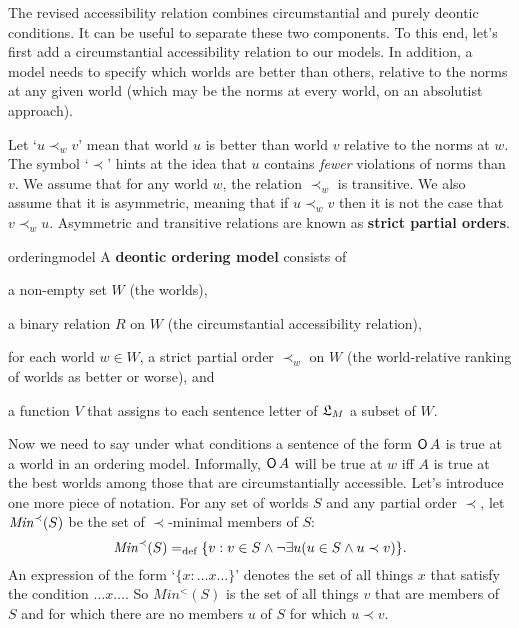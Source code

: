 The revised accessibility relation combines circumstantial and purely deontic
conditions. It can be useful to separate these two components. To this end,
let's first add a circumstantial accessibility relation to our models. In
addition, a model needs to specify which worlds are better than others, relative
to the norms at any given world (which may be the norms at every world, on an
absolutist approach).

Let `$u \prec_w v$' mean that world $u$ is better than world $v$ relative to the
norms at $w$. The symbol `$\prec$' hints at the idea that $u$ contains
\emph{fewer} violations of norms than $v$. We assume that for any world $w$,
the relation $\prec_w$ is transitive. We also assume that it is asymmetric,
meaning that if $u \prec_w v$ then it is not the case that $v \prec_w u$.
Asymmetric and transitive relations are known as \textbf{strict partial orders}.

\begin{definition}{}{orderingmodel}
  A \textbf{deontic ordering model} consists of
  \vspace{-3mm}
  \begin{itemize*}
    \item a non-empty set $W$ (the worlds),
    \item a binary relation $R$ on $W$ (the circumstantial accessibility
    relation),
    \item for each world $w\in W$, a strict partial order $\prec_w$ on $W$ (the
    world-relative ranking of worlds as better or worse), and
    \item a function $V$ that assigns to each sentence letter of $\mathfrak{L}_M$ a subset
    of $W$.
  \end{itemize*}
\end{definition}

Now we need to say under what conditions a sentence of the form $\operatorname{\mathsf{O}} A$ is true
at a world in an ordering model. Informally, $\operatorname{\mathsf{O}} A$ will be true at $w$ iff
$A$ is true at the best worlds among those that are circumstantially accessible.
Let's introduce one more piece of notation. For any set of worlds $S$ and any
partial order $\prec$, let $\emph{Min}^{\prec}(S)$ be the set of $\prec$-minimal
members of $S$:
\[
  \emph{Min}^{\prec}(S) =_\text{def} \{ v: v \in S \land \neg\exists u(u \in S \land u \prec v) \}.
\]
An expression of the form `$\{ x: \ldots x \ldots \}$' denotes the set of all
things $x$ that satisfy the condition $\ldots x \ldots$. So $Min^{<}(S)$ is the
set of all things $v$ that are members of $S$ and for which there are no members
$u$ of $S$ for which $u \prec v$.

